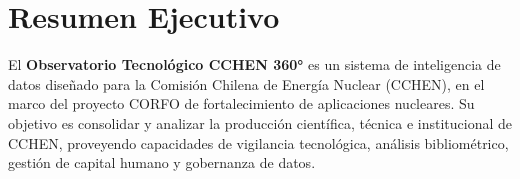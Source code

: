 \documentclass[12pt,a4paper]{report}
\begin{document}
\tableofcontents
\clearpage

\chapter{Resumen Ejecutivo}

El \textbf{Observatorio Tecnológico CCHEN 360°} es un sistema de inteligencia de datos diseñado para la Comisión Chilena de Energía Nuclear (CCHEN), en el marco del proyecto CORFO de fortalecimiento de aplicaciones nucleares. Su objetivo es consolidar y analizar la producción científica, técnica e institucional de CCHEN, proveyendo capacidades de vigilancia tecnológica, análisis bibliométrico, gestión de capital humano y gobernanza de datos.
\end{document}
